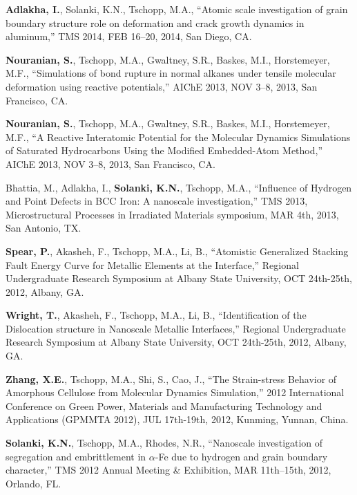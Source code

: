 \begin{cvlist}
\item
\textbf{Adlakha, I.}, Solanki, K.N., Tschopp, M.A., ``Atomic scale investigation of grain boundary structure role on deformation and crack growth dynamics in aluminum,'' TMS 2014, FEB 16--20, 2014, San Diego, CA.

\item
\textbf{Nouranian, S.}, Tschopp, M.A., Gwaltney, S.R., Baskes, M.I.,  Horstemeyer, M.F., ``Simulations of bond rupture in normal alkanes under tensile molecular deformation using reactive potentials,'' AIChE 2013, NOV 3--8, 2013, San Francisco, CA.

\item
\textbf{Nouranian, S.}, Tschopp, M.A., Gwaltney, S.R., Baskes, M.I.,  Horstemeyer, M.F., ``A Reactive Interatomic Potential for the Molecular Dynamics Simulations of Saturated Hydrocarbons Using the Modified Embedded-Atom Method,'' AIChE 2013, NOV 3--8, 2013, San Francisco, CA.

\item
Bhattia, M., Adlakha, I., \textbf{Solanki, K.N.}, Tschopp, M.A., ``Influence of Hydrogen and Point Defects in BCC Iron: A nanoscale investigation,'' TMS 2013, Microstructural Processes in Irradiated Materials symposium, MAR 4th, 2013, San Antonio, TX. 

\item
\textbf{Spear, P.}, Akasheh, F., Tschopp, M.A., Li, B., ``Atomistic Generalized Stacking Fault Energy Curve for Metallic Elements at the Interface,'' Regional Undergraduate Research Symposium at Albany State University, OCT 24th-25th, 2012, Albany, GA.

\item
\textbf{Wright, T.}, Akasheh, F., Tschopp, M.A., Li, B., ``Identification of the Dislocation structure in Nanoscale Metallic Interfaces,'' Regional Undergraduate Research Symposium at Albany State University, OCT 24th-25th, 2012, Albany, GA.

\item
\textbf{Zhang, X.E.}, Tschopp, M.A., Shi, S., Cao, J., ``The Strain-stress Behavior of Amorphous Cellulose from Molecular Dynamics Simulation,'' 2012 International Conference on Green Power, Materials and Manufacturing Technology and Applications (GPMMTA 2012), JUL 17th-19th, 2012, Kunming, Yunnan, China.

\item
\textbf{Solanki, K.N.}, Tschopp, M.A., Rhodes, N.R., ``Nanoscale investigation of segregation and embrittlement in $\alpha$-Fe due to hydrogen and grain boundary character,'' TMS 2012 Annual Meeting \& Exhibition, MAR 11th--15th, 2012, Orlando, FL.


\end{cvlist}

